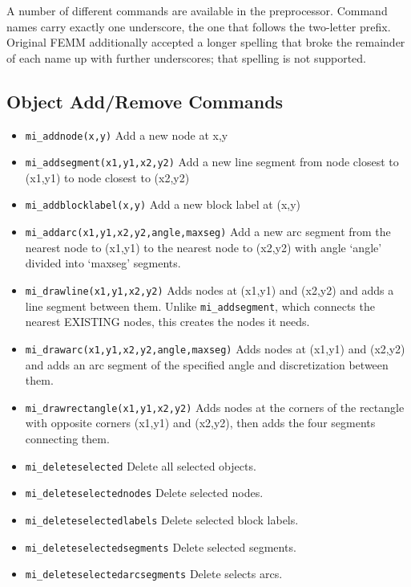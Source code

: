 A number of different commands are available in the preprocessor.
Command names carry exactly one underscore, the one that follows the
two-letter prefix.  Original FEMM additionally accepted a longer
spelling that broke the remainder of each name up with further
underscores; that spelling is not supported.

\subsection{Object Add/Remove Commands}

\begin{itemize}

\item{\tt mi\_addnode(x,y)} Add a new node at x,y

\item{\tt mi\_addsegment(x1,y1,x2,y2)} Add a new line segment from node
closest to (x1,y1) to node closest to (x2,y2)

\item{\tt mi\_addblocklabel(x,y)} Add a new block label at (x,y)

\item{\tt mi\_addarc(x1,y1,x2,y2,angle,maxseg)} Add a new arc segment
from the nearest node to (x1,y1) to the nearest node to (x2,y2)
with angle `angle' divided into `maxseg' segments.

\item{\tt mi\_drawline(x1,y1,x2,y2)} Adds nodes at (x1,y1) and (x2,y2) and adds a line segment between them. Unlike {\tt mi\_addsegment}, which connects the nearest EXISTING nodes, this creates the nodes it needs.

\item{\tt mi\_drawarc(x1,y1,x2,y2,angle,maxseg)} Adds nodes at (x1,y1) and (x2,y2) and adds an arc segment of the specified angle and discretization between them.

\item{\tt mi\_drawrectangle(x1,y1,x2,y2)} Adds nodes at the corners of the rectangle with opposite corners (x1,y1) and (x2,y2), then adds the four segments connecting them.

\item{\tt mi\_deleteselected} Delete all selected objects.

\item{\tt mi\_deleteselectednodes} Delete selected nodes.

\item{\tt mi\_deleteselectedlabels} Delete selected block labels.

\item{\tt mi\_deleteselectedsegments} Delete selected segments.

\item{\tt mi\_deleteselectedarcsegments} Delete selects arcs.
\end{itemize}

